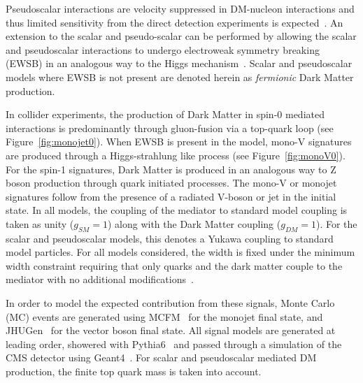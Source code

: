 Pseudoscalar interactions are velocity suppressed in DM-nucleon interactions and thus limited sensitivity from the direct detection experiments is expected~\cite{Haisch:2012kf}. 
An extension to the scalar and pseudo-scalar can be performed by
allowing the scalar and pseudoscalar interactions to undergo electroweak symmetry breaking (EWSB) in an analogous way to 
the Higgs mechanism~\cite{Khoze:2015sra,Hambye:2013sna,Khoze:2014xha,Khoze:2014woa,Altmannshofer:2014vra,Carone:2013wla,Heikinheimo:2013fta}. Scalar and pseudoscalar models 
where EWSB is not present are denoted herein as \emph{fermionic} Dark Matter production.

In collider experiments, the production of Dark Matter in spin-0 mediated interactions is predominantly through gluon-fusion via a top-quark loop (see Figure~\ref{fig:monojet0}). 
When EWSB is present in the model, mono-V signatures are produced through a Higgs-strahlung like 
process (see Figure~\ref{fig:monoV0}). For the spin-1 signatures, Dark Matter is produced in an analogous way to Z boson production through quark initiated processes. The mono-V or monojet signatures follow 
from the presence of a radiated V-boson or jet in the initial state. In all models, the coupling of the mediator to standard model coupling is taken as unity 
($g_{SM}=1$) along with 
the Dark Matter coupling ($g_{DM}=1$). For the scalar and pseudoscalar models, this denotes a Yukawa coupling to standard model particles. For all models considered, 
the width is fixed under the minimum width constraint requiring that
only quarks and the dark matter couple to the mediator with no
additional modifications~\cite{Harris:2014hga}.

In order to model the expected contribution from these signals, Monte Carlo (MC) events are generated using MCFM~\cite{mcfm}
for the monojet final state, and JHUGen~\cite{Anderson:2013afp} 
for the vector boson final state. All signal models are 
generated at leading order, showered with Pythia6~\cite{Sjostrand:2006za} and passed through a 
simulation of the CMS detector using Geant4~\cite{geant4}. 
For scalar and pseudoscalar mediated DM production, the finite top
quark mass is taken into account. 

